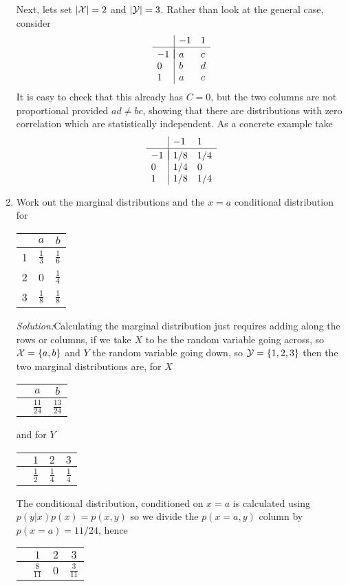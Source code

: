 \documentclass[12pt]{article}
\newcommand{\soln}{\noindent\textit{Solution:}}
\begin{document}
\begin{enumerate}
Next, lets set $|{\cal X}|=2$ and $|{\cal Y}|=3$. Rather than look at
the general case, consider
\begin{equation}
\begin{array}{l|ll}
&-1&1\\
\hline\\[-10pt]
-1&a&c\\
0&b&d\\
1&a&c
\end{array}
\end{equation}
It is easy to check that this already has $C=0$, but the two columns
are not proportional provided $ad\not=bc$, showing that there are
distributions with zero correlation which are statistically
independent. As a concrete example take
\begin{equation}
\begin{array}{l|ll}
&-1&1\\
\hline\\[-10pt]
-1&1/8&1/4\\
0&1/4&0\\
1&1/8&1/4
\end{array}
\end{equation}


\item Work out the marginal distributions and the $x=a$ conditional distribution for
\begin{center}
\begin{tabular}{c|cc}
&$a$&$b$\\
\hline
1&$\frac{1}{3}$&$\frac{1}{6}$\\
2&0&$\frac{1}{4}$\\
3&$\frac{1}{8}$&$\frac{1}{8}$
\end{tabular}
\end{center}


\soln Calculating the marginal distribution just requires adding along the rows or columns, if we take $X$ to be the random variable going across, so ${\cal X}=\{a,b\}$ and $Y$ the random variable going down, so ${\cal Y}=\{1,2,3\}$ then the two marginal distributions are, for $X$
\begin{center}
\begin{tabular}{c|cc}
&$a$&$b$\\
\hline
&$\frac{11}{24}$&$\frac{13}{24}$
\end{tabular}
\end{center}
and for $Y$
\begin{center}
\begin{tabular}{c|ccc}
&$1$&$2$&$3$\\
\hline
&$\frac{1}{2}$&$\frac{1}{4}$&$\frac{1}{4}$
\end{tabular}
\end{center}
The conditional distribution, conditioned on $x=a$ is calculated using
$p(y|x)p(x)=p(x,y)$ so we divide the $p(x=a,y)$ column by
$p(x=a)=11/24$, hence
\begin{center}
\begin{tabular}{c|ccc}
&$1$&$2$&$3$\\
\hline
&$\frac{8}{11}$&$0$&$\frac{3}{11}$
\end{tabular}
\end{center}




\end{enumerate}
\end{document}
